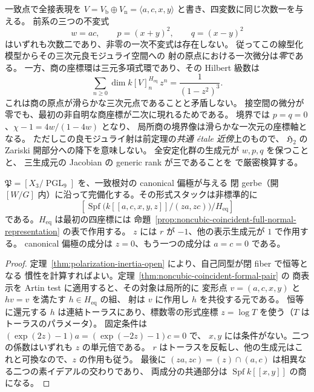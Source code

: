 \begin{remark}[形式良モジュライ射の二次的分岐]
\label{rem:coincident-local-good-quotient-quadratic}
一致点で全接表現を
$V=V_{\mathrm b}\oplus V_{\mathrm n}=\langle a,c,x,y\rangle$
と書き、四変数に同じ次数一を与える。
前系の三つの不変式
\[
 w=ac,\qquad p=(x+y)^2,\qquad q=(x-y)^2
\]
はいずれも次数二であり、非零の一次不変式は存在しない。
従ってこの線型化模型からその三次元良モジュライ空間への
射の原点における一次微分は\emph{零}である。
一方、商の座標環は三元多項式環であり、その Hilbert 級数は
\[
 \sum_{n\ge0}\dim k[V]^{H_{\mathrm{eq}}}_n\,z^n
 =\frac{1}{(1-z^2)^3}.
\]
これは商の原点が滑らかな三次元点であることと矛盾しない。
接空間の微分が零でも、最初の非自明な商座標が二次に現れるためである。
境界では $p=q=0$、$\chi-1=4w/(1-4w)$ となり、
局所商の境界像は滑らかな一次元の座標軸となる。
ただしこの良モジュライ射は前定理の\emph{共通 étale 近傍}上のもので、
$\mathfrak H_2$ の Zariski 開部分への降下を意味しない。
全安定化群の生成元が $w,p,q$ を保つことと、
三生成元の Jacobian の generic rank が三であることを
 で厳密検算する。
\end{remark}

\begin{corollary}[一致根対での偏極付き形式近傍の二成分]
\label{cor:coincident-polarized-inertia-branches}
$\mathfrak P=[X_3/\operatorname{PGL}_9]$ を、一致根対の canonical 偏極が与える
閉 gerbe（開 $[W/G]$ 内）に沿って完備化する。その形式スタックは非標準的に
\[
 \left[\operatorname{Spf}
     \bigl(k[[a,c,x,y,z]]/(za,zc)\bigr)/H_{\mathrm{eq}}\right]
\]
である。$H_{\mathrm{eq}}$ は最初の四座標には
命題~\ref{prop:noncubic-coincident-full-normal-representation} の表で作用する。
$z$ には $r$ が $-1$、他の表示生成元が $1$ で作用する。
canonical 偏極の成分は $z=0$、もう一つの成分は $a=c=0$ である。
\end{corollary}
\begin{proof}
定理~\ref{thm:polarization-inertia-open} により、自己同型が閉 fiber で恒等となる
慣性を計算すればよい。定理~\ref{thm:noncubic-coincident-formal-pair} の
商表示を Artin test に適用すると、その対象は局所的に
変形点 $v=(a,c,x,y)$ と $hv=v$ を満たす $h\in H_{\mathrm{eq}}$ の組、
射は $v$ に作用し $h$ を共役する元である。
恒等に還元する $h$ は連結トーラスにあり、標数零の形式座標
$z=\log T$ を使う（$T$ はトーラスのパラメータ）。
固定条件は $(\exp(2z)-1)a=(\exp(-2z)-1)c=0$ で、
$x,y$ には条件がない。二つの係数はいずれも $z$ の単元倍である。
$r$ はトーラスを反転し、他の生成元はこれと可換なので、$z$ の作用も従う。
最後に $(za,zc)=(z)\cap(a,c)$ は相異なる二つの素イデアルの交わりであり、
両成分の共通部分は $\operatorname{Spf} k[[x,y]]$ の商になる。
\end{proof}
